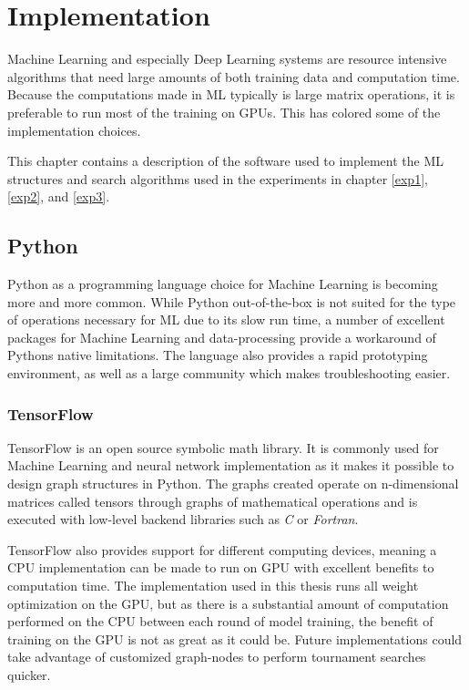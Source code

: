 \chapter{Implementation}
\label{implementation}
Machine Learning and especially Deep Learning systems are resource intensive algorithms that need large amounts of both training data and computation time. Because the computations made in ML typically is large matrix operations, it is preferable to run most of the training on GPUs. This has colored some of the implementation choices.

This chapter contains a description of the software used to implement the ML structures and search algorithms used in the experiments in chapter \ref{exp1}, \ref{exp2}, and \ref{exp3}.

\section{Python}
Python as a programming language choice for Machine Learning is becoming more and more common. While Python out-of-the-box is not suited for the type of operations necessary for ML due to its slow run time, a number of excellent packages for Machine Learning and data-processing provide a workaround of Pythons native limitations. The language also provides a rapid prototyping environment, as well as a large community which makes troubleshooting easier. 

\subsection{TensorFlow}
TensorFlow\cite{tensorflow} is an open source symbolic math library. It is commonly used for Machine Learning and neural network implementation as it makes it possible to design graph structures in Python. The graphs created operate on n-dimensional matrices called tensors through graphs of mathematical operations and is executed with low-level backend libraries such as \textit{C} or \textit{Fortran}.

TensorFlow also provides support for different computing devices, meaning a CPU implementation can be made to run on GPU with excellent benefits to computation time. The implementation used in this thesis runs all weight optimization on the GPU, but as there is a substantial amount of computation performed on the CPU between each round of model training, the benefit of training on the GPU is not as great as it could be. Future implementations could take advantage of customized graph-nodes to perform tournament searches quicker. 

